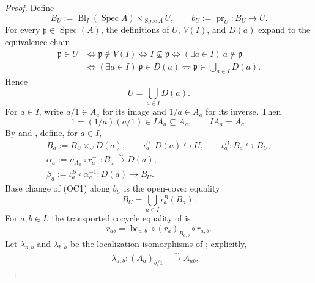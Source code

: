 \begin{proof}
  Define
  \[
    B_U:=\operatorname{Bl}_I(\operatorname{Spec}A)
      \times_{\operatorname{Spec}A}U,
    \qquad b_U:=\operatorname{pr}_U\colon B_U\to U.
  \]
  For every $\mathfrak p\in\operatorname{Spec}(A)$, the definitions of
  $U$, $V(I)$, and $D(a)$ expand to the equivalence chain
  \[
  \begin{aligned}
    \mathfrak p\in U
      &\Longleftrightarrow \mathfrak p\notin V(I)
       \Longleftrightarrow I\nsubseteq\mathfrak p
       \Longleftrightarrow
         (\exists a\in I)\ a\notin\mathfrak p\\
      &\Longleftrightarrow
         (\exists a\in I)\ \mathfrak p\in D(a)
       \Longleftrightarrow
         \mathfrak p\in\bigcup_{a\in I}D(a).
  \end{aligned}
  \]
  Hence
  \[
    U=\bigcup_{a\in I}D(a).                                      \tag{OC1}
  \]
  For $a\in I$, write $a/1\in A_a$ for its image and $1/a\in A_a$ for
  its inverse.  Then
  \[
    1=(1/a)(a/1)\in IA_a\subseteq A_a,
    \qquad IA_a=A_a.                                             \tag{OC2}
  \]
  By  and
  , define, for $a\in I$,
  \[
  \begin{gathered}
    B_a:=B_U\times_UD(a),\qquad
    \iota_a^U\colon D(a)\hookrightarrow U,\qquad
    \iota_a^B\colon B_a\hookrightarrow B_U,\\
    \alpha_a:=\upsilon_{A_a}\circ r_a^{-1}
      \colon B_a\xrightarrow{\sim}D(a),\\
    \beta_a:=\iota_a^B\circ\alpha_a^{-1}
      \colon D(a)\longrightarrow B_U.
  \end{gathered}                                                   \tag{OC3}
  \]
  Base change of (OC1) along $b_U$ is the open-cover equality
  \[
    B_U=\bigcup_{a\in I}\iota_a^B(B_a).                         \tag{OC3a}
  \]
  For $a,b\in I$, the transported cocycle equality of
   is
  \[
    r_{ab}
      =\operatorname{bc}_{a,b}\circ
        (r_a)_{B_{a,b}}\circ r_{a,b}.                            \tag{OC3b}
  \]
  Let $\lambda_{a,b}$ and $\lambda_{b,a}$ be the localization
  isomorphisms of ; explicitly,
  \[
  \begin{aligned}
    \lambda_{a,b}\colon(A_a)_{b/1}&\xrightarrow{\sim}A_{ab},&

\end{aligned}\]
\end{proof}
